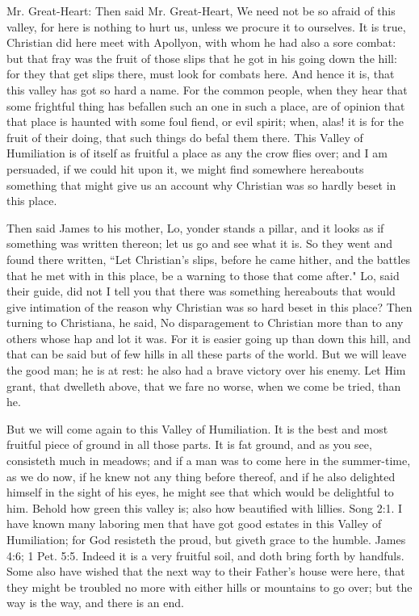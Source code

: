 Mr. Great-Heart: Then said Mr. Great-Heart, We need not be so afraid of this valley, for here is nothing to hurt us, unless we procure it to ourselves. It is true, Christian did here meet with Apollyon, with whom he had also a sore combat: but that fray was the fruit of those slips that he got in his going down the hill: for they that get slips there, must look for combats here. And hence it is, that this valley has got so hard a name. For the common people, when they hear that some frightful thing has befallen such an one in such a place, are of opinion that that place is haunted with some foul fiend, or evil spirit; when, alas! it is for the fruit of their doing, that such things do befal them there. This Valley of Humiliation is of itself as fruitful a place as any the crow flies over; and I am persuaded, if we could hit upon it, we might find somewhere hereabouts something that might give us an account why Christian was so hardly beset in this place.

Then said James to his mother, Lo, yonder stands a pillar, and it looks as if something was written thereon; let us go and see what it is. So they went and found there written, ``Let Christian's slips, before he came hither, and the battles that he met with in this place, be a warning to those that come after." Lo, said their guide, did not I tell you that there was something hereabouts that would give intimation of the reason why Christian was so hard beset in this place? Then turning to Christiana, he said, No disparagement to Christian more than to any others whose hap and lot it was. For it is easier going up than down this hill, and that can be said but of few hills in all these parts of the world. But we will leave the good man; he is at rest: he also had a brave victory over his enemy. Let Him grant, that dwelleth above, that we fare no worse, when we come be tried, than he.

But we will come again to this Valley of Humiliation. It is the best and most fruitful piece of ground in all those parts. It is fat ground, and as you see, consisteth much in meadows; and if a man was to come here in the summer-time, as we do now, if he knew not any thing before thereof, and if he also delighted himself in the sight of his eyes, he might see that which would be delightful to him. Behold how green this valley is; also how beautified with lillies. Song 2:1. I have known many laboring men that have got good estates in this Valley of Humiliation; for God resisteth the proud, but giveth grace to the humble. James 4:6; 1 Pet. 5:5. Indeed it is a very fruitful soil, and doth bring forth by handfuls. Some also have wished that the next way to their Father's house were here, that they might be troubled no more with either hills or mountains to go over; but the way is the way, and there is an end.

